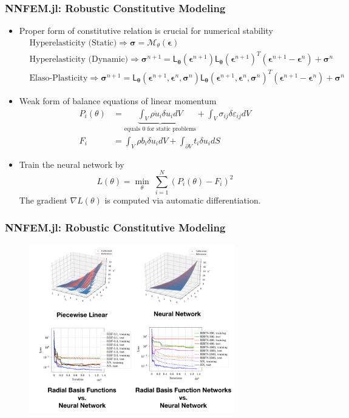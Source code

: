 \documentclass{beamer}
\newcommand{\ChoL}{\mathsf{L}}
\newcommand{\bt}[0]{\bm{\theta}}
\begin{document}
\begin{frame}
	\frametitle{NNFEM.jl: Robustic Constitutive Modeling}
	\begin{itemize}
\item Proper form of constitutive relation is crucial for numerical stability
{\footnotesize\begin{align*}
&\mbox{Hyperelasticity (Static)} \Rightarrow \bm\sigma = \mathcal{M}_{\theta}(\bm\epsilon) \qquad\qquad\qquad\qquad \\
&\mbox{Hyperelasticity (Dynamic)} \Rightarrow \bm{\sigma}^{n+1}  =  \ChoL_{\bt}(\bm\epsilon^{n+1}) \ChoL_{\bt}(\bm\epsilon^{n+1})^T (\bm{\epsilon}^{n+1} - \bm{\epsilon}^{n})  + \bm{\sigma}^{n}  \\
&	\mbox{Elaso-Plasticity}\Rightarrow \bm\sigma^{n+1} = \ChoL_{\bt}(\bm\epsilon^{n+1},\bm{\epsilon}^{n},\bm{\sigma}^{n}) \ChoL_{\bt}(\bm\epsilon^{n+1},\bm{\epsilon}^{n},\bm{\sigma}^{n})^T (\bm{\epsilon}^{n+1} - \bm{\epsilon}^{n})  + \bm{\sigma}^{n} 
\end{align*}
}
	\item Weak form of balance equations of linear momentum 
	{\small
	\begin{align*}
		P_i(\theta) &=\underbrace{ \int_V \rho \ddot u_i \delta u_i dV}_{\mbox{equals 0 for static problems}} + \int_{V} \sigma_{ij} \delta \varepsilon_{ij}dV\\
		F_i &= \int_{V}\rho b_i \delta u_i dV + \int_{\partial V} t_i\delta u_idS
	\end{align*}
	}
	\item Train the neural network by 
	$$\boxed{L(\theta) = \min_{\theta}\;\sum_{i=1}^N(P_i(\theta) - F_i)^2}$$
	The gradient $\nabla L(\theta)$ is computed via automatic differentiation.

\end{itemize}
\end{frame}

\begin{frame}
	\frametitle{NNFEM.jl: Robustic Constitutive Modeling}
\begin{figure}[hbt]
  \includegraphics[width=0.8\textwidth]{../vs}
\end{figure}
\end{frame}
\end{document}
